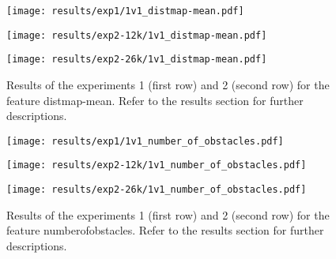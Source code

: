 \begin{figure}[h!]
	\centering
	\begin{minipage}{0.4\linewidth}
		\texttt{[image: results/exp1/1v1\_distmap-mean.pdf]}
	\end{minipage}
	
	\begin{minipage}{0.4\linewidth}
		\texttt{[image: results/exp2-12k/1v1\_distmap-mean.pdf]}
	\end{minipage}
	\begin{minipage}{0.4\linewidth}
		\texttt{[image: results/exp2-26k/1v1\_distmap-mean.pdf]}
	\end{minipage}
	
	\caption[ Results: Feature distmap-mean]{ Results of the experiments 1 (first row) and 2 (second row) for the feature distmap-mean. Refer to the results section for further descriptions. }
	\label{fig:appendix_distmap-mean}
\end{figure}
\newpage 


\begin{figure}[h!]
	\centering
	\begin{minipage}{0.4\linewidth}
		\texttt{[image: results/exp1/1v1\_number\_of\_obstacles.pdf]}
	\end{minipage}
	
	\begin{minipage}{0.4\linewidth}
		\texttt{[image: results/exp2-12k/1v1\_number\_of\_obstacles.pdf]}
	\end{minipage}
	\begin{minipage}{0.4\linewidth}
		\texttt{[image: results/exp2-26k/1v1\_number\_of\_obstacles.pdf]}
	\end{minipage}
	
	\caption[ Results: Feature number\textunderscore of\textunderscore obstacles]{ Results of the experiments 1 (first row) and 2 (second row) for the feature number\textunderscore of\textunderscore obstacles. Refer to the results section for further descriptions. }
	\label{fig:appendix_number_of_obstacles}
\end{figure}

